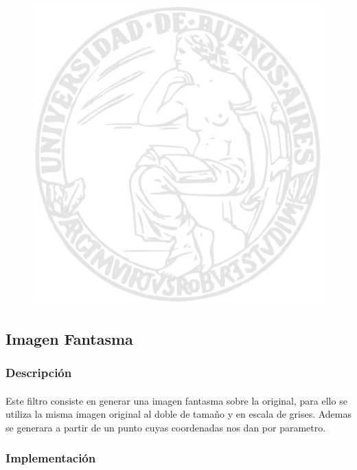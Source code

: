 \documentclass[a4paper]{article}
\begin{document}
\begin{figure}
  \begin{center}
	\includegraphics[scale=0.66]{img/logouba.jpg}
	\label{nombreparareferenciar}
  \end{center}
\end{figure}

\subsection{Imagen Fantasma}

\subsubsection{Descripci\'on}

\paragraph{} Este filtro consiste en generar una imagen fantasma sobre la original, para ello se utiliza la misma imagen original al doble de tamaño y en escala de grises. Ademas se generara a partir de un punto cuyas coordenadas nos dan por parametro.

\subsubsection{Implementaci\'on}
\end{document}
